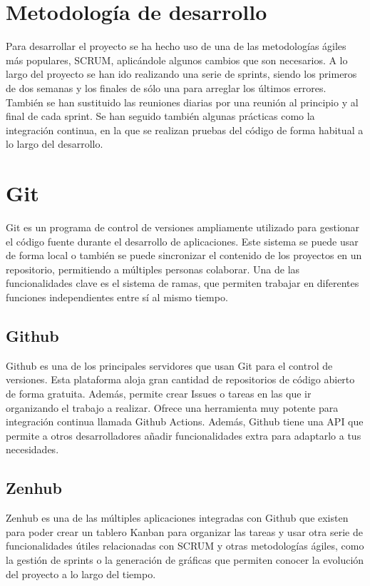 \section{Metodología de desarrollo}
Para desarrollar el proyecto se ha hecho uso de una de las metodologías ágiles más populares, SCRUM, aplicándole algunos cambios que son necesarios. A lo largo del proyecto se han ido realizando una serie de sprints, siendo los primeros de dos semanas y los finales de sólo una para arreglar los últimos errores. También se han sustituido las reuniones diarias por una reunión al principio y al final de cada sprint. Se han seguido también algunas prácticas como la integración continua, en la que se realizan pruebas del código de forma habitual a lo largo del desarrollo.

\section{Git}
Git es un programa de control de versiones ampliamente utilizado para gestionar el código fuente durante el desarrollo de aplicaciones. Este sistema se puede usar de forma local o también se puede sincronizar el contenido de los proyectos en un repositorio, permitiendo a múltiples personas colaborar. Una de las funcionalidades clave es el sistema de ramas, que permiten trabajar en diferentes funciones independientes entre sí al mismo tiempo.
\subsection{Github}
Github es una de los principales servidores que usan Git para el control de versiones. Esta plataforma aloja gran cantidad de repositorios de código abierto de forma gratuita. Además, permite crear Issues o tareas en las que ir organizando el trabajo a realizar. Ofrece una herramienta muy potente para integración continua llamada Github Actions. Además, Github tiene una API que permite a otros desarrolladores añadir funcionalidades extra para adaptarlo a tus necesidades.
\subsection{Zenhub}
Zenhub es una de las múltiples aplicaciones integradas con Github que existen para poder crear un tablero Kanban para organizar las tareas y usar otra serie de funcionalidades útiles relacionadas con SCRUM y otras metodologías ágiles, como la gestión de sprints o la generación de gráficas que permiten conocer la evolución del proyecto a lo largo del tiempo.

